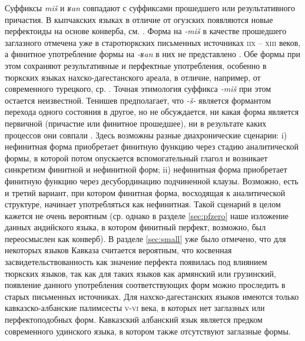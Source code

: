 \par Суффиксы \textit{miš} и \textit{ʁan} совпадают с суффиксами прошедшего или результативного причастия. В кыпчакских языках в отличие от огузских появляются новые перфектоиды на основе конверба, см. \citep{johanson2018}. Форма на \textit{-miš} в качестве прошедшего заглазного отмечена уже в старотюркских письменных источниках \textsc{iix -- xiii} веков, а финитное употребление формы на \textit{-ʁan} в них не представлено \citep[233]{erdal2004}. Обе формы при этом сохраняют результативные и перфектные употребления, особенно в тюркских языках нахско-дагестанского ареала, в отличие, например, от современного турецкого, ср. \citep[188]{slobinaksukoc1982}. Точная этимология суффикса \textit{-miš} при этом остается неизвестной. Тенишев предполагает, что \textit{-š-} является формантом перехода одного состояния в другое, но не обсуждается, ни какая форма является первичной (причастие или финитное прошедшее), ни в результате каких процессов они совпали \citep[189--190]{tenishev2002}. Здесь возможны разные диахронические сценарии: i) нефинитная форма приобретает финитную функцию через стадию аналитической формы, в которой потом опускается вспомогательный глагол и возникает синкретизм финитной и нефинитной форм; ii) нефинитная форма приобретает финитную функцию через десубординацию подчиненной клаузы. Возможно, есть и третий вариант, при котором финитная форма, восходящая к аналитической структуре, начинает употребляться как нефинитная. Такой сценарий в целом кажется не очень вероятным (ср. однако в разделе \ref{sec:pfzero} наше изложение данных андийского языка, в котором финитный перфект, возможно, был переосмыслен как конверб). В разделе \ref{sec:small} уже было отмечено, что для некоторых языков Кавказа считается вероятным, что косвенная засвидетельствованность как значение перфекта появилась под влиянием тюркских языков, так как для таких языков как армянский или грузинский, появление данного употребления соответствующих форм можно проследить в старых письменных источниках. Для нахско-дагестанских языков имеются только кавказско-албанские палимсесты \textsc{v-vi} века, в которых нет заглазных или перфектоподобных форм. Кавказский албанский язык является предком современного удинского языка, в котором также отсутствуют заглазные формы. 
